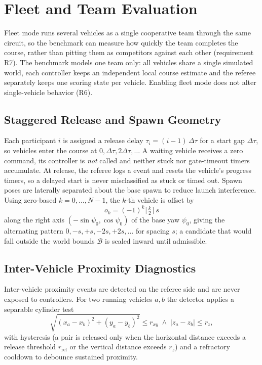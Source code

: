 \section{Fleet and Team Evaluation}
\label{sec:fleet}

Fleet mode runs several vehicles as a single cooperative team through the same circuit, so the benchmark can measure how quickly the team completes the course, rather than pitting them as competitors against each other (requirement R7). The benchmark models one team only: all vehicles share a single simulated world, each controller keeps an independent local course estimate and the referee separately keeps one scoring state per vehicle. Enabling fleet mode does not alter single-vehicle behavior (R6).

\subsection{Staggered Release and Spawn Geometry}

Each participant $i$ is assigned a release delay $\tau_i=(i-1)\,\Delta\tau$ for a start gap $\Delta\tau$, so vehicles enter the course at $0,\Delta\tau,2\Delta\tau,\dots$ A waiting vehicle receives a zero command, its controller  is \emph{not} called and neither stuck nor gate-timeout timers accumulate. At release, the referee logs a  event and resets the vehicle's progress timers, so a delayed start is never misclassified as stuck or timed out. Spawn poses are laterally separated about the base spawn to reduce launch interference. Using zero-based $k=0,\ldots,N-1$, the $k$-th vehicle is offset by
\begin{equation}
\label{eq:spawn_offset}
o_k = (-1)^{k}\Big\lceil \tfrac{k}{2}\Big\rceil\, s
\end{equation}
along the right axis $(-\sin\psi_0,\cos\psi_0)$ of the base yaw $\psi_0$, giving the alternating pattern $0,-s,+s,-2s,+2s,\dots$ for spacing $s$; a candidate that would fall outside the world bounds $\mathcal{B}$ is scaled inward until admissible.

\subsection{Inter-Vehicle Proximity Diagnostics}

Inter-vehicle proximity events are detected on the referee side and are never exposed to controllers. For two running vehicles $a,b$ the detector applies a separable cylinder test
\begin{equation}
\label{eq:ivc}
\sqrt{(x_a-x_b)^2+(y_a-y_b)^2}\le r_{xy}\;\wedge\;|z_a-z_b|\le r_z,
\end{equation}
with hysteresis (a pair is released only when the horizontal distance exceeds a release threshold $r_{\mathrm{rel}}$ or the vertical distance exceeds $r_z$) and a refractory cooldown to debounce sustained proximity.


